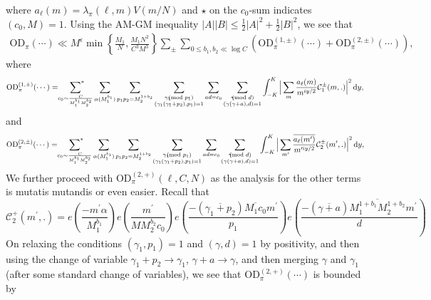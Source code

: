 \documentclass[12pt,a4paper,twoside, reqno]{amsart}
\newcommand{\shortmod}{\ensuremath{\negthickspace \negthickspace \negthickspace \pmod}}
\newcommand{\sumstar}{\sideset{}{^*}\sum}
\newcommand{\e}[2]{e\left(\frac{#1}{#2}\right)}
\begin{document}
where $a_\ell(m)=\lambda_\pi (\ell, m)V(m/N)$ and $\star$ on the $c_0$-sum indicates $(c_0,M)=1$. Using the AM-GM inequality $ |A||B|\leq 
\frac{1}{2}|A|^2 + \frac{1}{2} |B|^2$, we see that 
\begin{align}\label{od after am-gm}
    \mathrm{OD}_{\pi}(\cdots) \ll  M^{\epsilon}\min\left\{\frac{M_1}{{N}}, \frac{M_1N^2}{C^3M^3}\right\}   \sum_{\pm}  \sum_{0 \leq b_1, b_2 \ll \log C }  (\mathrm{OD}_{\pi}^{(1, \pm)}(\cdots)+\mathrm{OD}_{\pi}^{(2, \pm)}(\cdots )),
\end{align}
where 
\begin{align*}
       \mathrm{OD}_{\pi}^{(1, \pm)}(\cdots) = \mathop{\sumstar_{ \substack{c_0 \sim \frac{C}{M_1^{b_1}M_2^{b_2}}
       } } }  \mathop{\sum}_{\substack{\alpha (M_1^{b_1})  }} \sum_{p_1p_2=M_2^{1+b_2}} \sum_{\substack{\gamma_1 \shortmod{p_1} \\ (\gamma_1(\gamma_1+p_2),p_1)=1}} \sum_{ad=c_0}\sum_{\substack{\gamma \shortmod{d} \\ (\gamma(\gamma+a),d)=1}}   
        \int_{-K}^K \Big|\sum_m  \frac{ a_\ell(m)}{m^{iy/2}}   \mathcal{C}_1^{\pm}(m,.)    \Big|^2
       \,\mathrm{d}y,
\end{align*}
and 
\begin{align*}
       \mathrm{OD}_{\pi}^{(2, \pm)}(\cdots) = \mathop{\sumstar_{ \substack{c_0 \sim \frac{C}{M_1^{b_1}M_2^{b_2}}
       } } }  \mathop{\sum}_{\substack{\alpha (M_1^{b_1})  }} \sum_{p_1p_2=M_2^{1+b_2}} \sum_{\substack{\gamma_1 \shortmod{p_1} \\ (\gamma_1(\gamma_1+p_2),p_1)=1}} \sum_{ad=c_0}\sum_{\substack{\gamma \shortmod{d} \\ (\gamma(\gamma+a),d)=1}}   
        \int_{-K}^K \Big|\sum_{m^\prime}  \frac{ \overline{a_\ell(m^\prime)}}{m^{\prime iy/2}}   \mathcal{C}_2^{\pm}(m^\prime,.)    \Big|^2
       \,\mathrm{d}y,
\end{align*}
We further proceed with $ \mathrm{OD}_{\pi}^{(2,+)}(\ell,C, N)$ as the analysis for the other terms is mutatis mutandis or even easier. Recall that 
   \[ \mathcal{C}_2^{+}(m^\prime, . ) = e\left(\frac{   - m^\prime \alpha}{M_1^{b_1}} \right)  e\left(\frac{m^\prime}{MM_2^{b_2}c_0} \right) \e{-  (\overline{\gamma_1+p_2})  \overline{M_1c_0} m^\prime}{p_1}  \e{ -  (\overline{\gamma+a})  \overline{M_1^{1+b_1} M_2^{1+b_2}} m^\prime}{d}    \]
On relaxing the conditions $(\gamma_1,p_1)=1$ and $(\gamma,d)=1$ by positivity, and then using the change of  variable $\gamma_1+p_2\rightarrow \gamma_1$, $\gamma+a \rightarrow \gamma$,  and then merging $\gamma$ and $\gamma_1$ (after some standard change of variables), we see that $  \mathrm{OD}_{\pi}^{(2, +)}(\cdots)  $ is bounded by
\end{document}
